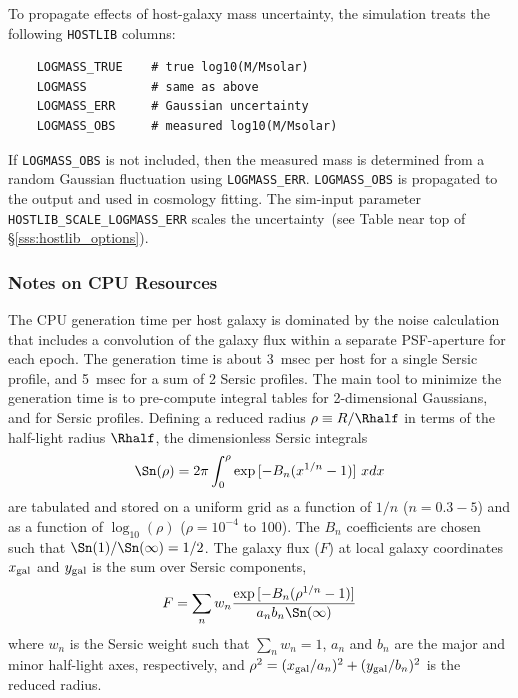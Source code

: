 \documentclass[12pt]{article}
\newcommand{\unc}{uncertainty}
\begin{document}
{To propagate effects of  host-galaxy mass \unc,
the simulation treats the following {\tt HOSTLIB} columns:
%
\begin{Verbatim}
    LOGMASS_TRUE    # true log10(M/Msolar)
    LOGMASS         # same as above
    LOGMASS_ERR     # Gaussian uncertainty
    LOGMASS_OBS     # measured log10(M/Msolar)
\end{Verbatim}
%
If {\tt LOGMASS\_OBS} is not included, then the measured
mass is determined from a random Gaussian fluctuation
using {\tt LOGMASS\_ERR}. {\tt LOGMASS\_OBS} is propagated
to the output and used in cosmology fitting.
The sim-input parameter {\tt HOSTLIB\_SCALE\_LOGMASS\_ERR} scales 
the \unc\
(see Table near top of \S\ref{sss:hostlib_options}).



\subsubsection{Notes on CPU Resources}
\label{sss:hostlib_CPU}

The CPU generation time per host galaxy is dominated by the 
noise calculation that includes a convolution of the galaxy 
flux within a separate PSF-aperture for each epoch.  
The generation time is about 3~msec per host for a 
single Sersic profile, and 5~msec for a sum of 2 Sersic profiles.
The main tool to minimize the generation  time is to pre-compute
integral tables for 2-dimensional Gaussians,
and for Sersic profiles. 
Defining a reduced radius $\rho \equiv R/\Rhalf$ in terms
of the half-light radius $\Rhalf$,
the dimensionless Sersic integrals
%
\begin{equation}
  \Sn(\rho) = 2\pi\int_0^\rho  \exp{[-B_n (x^{1/n} -1)]}~ x dx 
\end{equation}
%
are tabulated and stored on a uniform grid as a function of
$1/n$ ($n=0.3 - 5$) and as a function of $\log_{10}(\rho)$
($\rho=10^{-4}$ to 100).  The $B_n$ coefficients are chosen
such that $\Sn(1)/\Sn(\infty) = 1/2$.
The galaxy flux ($F$) at local galaxy coordinates
$x_{\rm gal}$ and $y_{\rm gal}$
is the sum over Sersic components,
\begin{equation}
   F = \sum_n w_n \frac{ \exp{ [-B_n (\rho^{1/n}-1)] } }{a_n b_n\Sn(\infty)} 
\end{equation}
where $w_n$ is the Sersic weight such that $\sum_n w_n=1$,
$a_n$ and $b_n$ are the major and minor half-light axes, 
respectively, and 
$\rho^2 = (x_{\rm gal}/a_n)^2 + (y_{\rm gal}/b_n)^2$
is the reduced radius.



}
\end{document}
